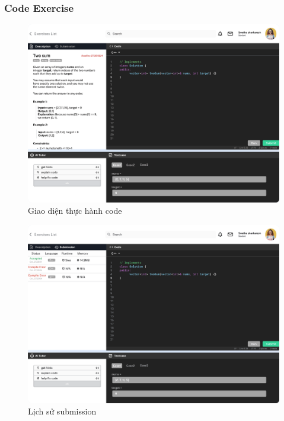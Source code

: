 \subsubsection{Code Exercise}
\begin{figure}[H]
    \centering
    \includegraphics[width=0.7\linewidth]{Images/Anh/UI_practice_code.png}
    \caption{Giao diện thực hành code}
    \label{fig:enter-label}
\end{figure}
\begin{figure}[H]
    \centering
    \includegraphics[width=0.7\linewidth]{Images/Anh/UI_Practice_submission.png}
    \caption{Lịch sử submission}
    \label{fig:enter-label}
\end{figure}
